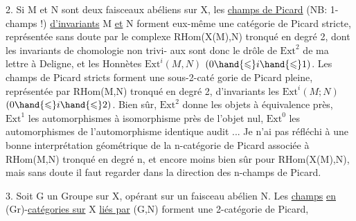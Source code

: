 2. Si M et N sont deux faisceaux abéliens sur X, les \uline{champs de Picard}
(NB: 1-champs !) \uline{d'invariants} M \uline{et} N forment eux-même une catégorie de
\margin{$\times$} Picard stricte, représentée  sans doute par le complexe RHom(X(M),N) 
tronqué en  degré 2, dont les invariants de chomologie non trivi-%
aux sont donc le drôle de $\mathrm{Ext}^2$ de ma lettre à Deligne, et les Honnètes
$\mathrm{Ext}^i(M,N)$  $(0 \hand{\leqslant} i \hand{\leqslant} 1)$. Les champs de Picard stricts forment une sous-2-caté%
gorie de Picard pleine, représentée par RHom(M,N) tronqué en degré 2,
d'invariants les $\mathrm{Ext}^i(M;N)$ $(0 \hand{\leqslant} i \hand{\leqslant} 2)$. Bien sûr, $\mathrm{Ext}^2$ donne les objets à
équivalence près, $\mathrm{Ext}^1$ les automorphismes à isomorphisme près de l'objet
nul, $\mathrm{Ext}^0$ les automorphismes de l'automorphisme identique audit ... Je n'ai
pas réfléchi à une bonne interprétation géométrique de la n-catégorie de
Picard associée à RHom(M,N) tronqué en degré n, et encore moins bien sûr
pour RHom(X(M),N), mais sans doute il faut regarder dans la direction des
n-champs de Picard.

3. Soit G un Groupe sur X, opérant sur un faisceau abélien N. Les \uline{champs}
\uline{en} (Gr)-\uline{catégories sur} X \uline{liés par} (G,N) forment une 2-catégorie de Picard,

